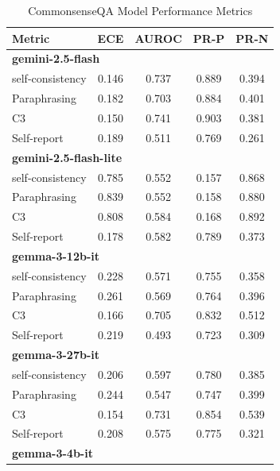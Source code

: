 \documentclass[11pt]{article}
\theoremstyle{plain}
\theoremstyle{definition}
\theoremstyle{remark}
\begin{document}
\begin{table}[p]
\centering
\caption{CommonsenseQA Model Performance Metrics}
\label{tab:cqa-metrics}
\scriptsize
\begin{minipage}[t]{0.48\textwidth}
    \centering
    \begin{tabular}{lcccc}
        \toprule
        \textbf{Metric} & \textbf{ECE} & \textbf{AUROC} & \textbf{PR-P} & \textbf{PR-N} \\
        \midrule
        \multicolumn{5}{l}{\textbf{gemini-2.5-flash}} \\
        self-consistency & 0.146 & 0.737 & 0.889 & 0.394 \\
        Paraphrasing     & 0.182 & 0.703 & 0.884 & 0.401 \\
       C3             & 0.150 & 0.741 & 0.903 & 0.381 \\
        Self-report      & 0.189 & 0.511 & 0.769 & 0.261 \\
        \midrule
        \multicolumn{5}{l}{\textbf{gemini-2.5-flash-lite}} \\
        self-consistency & 0.785 & 0.552 & 0.157 & 0.868 \\
        Paraphrasing     & 0.839 & 0.552 & 0.158 & 0.880 \\
       C3             & 0.808 & 0.584 & 0.168 & 0.892 \\
        Self-report      & 0.178 & 0.582 & 0.789 & 0.373 \\
        \midrule
        \multicolumn{5}{l}{\textbf{gemma-3-12b-it}} \\
        self-consistency & 0.228 & 0.571 & 0.755 & 0.358 \\
        Paraphrasing     & 0.261 & 0.569 & 0.764 & 0.396 \\
       C3             & 0.166 & 0.705 & 0.832 & 0.512 \\
        Self-report      & 0.219 & 0.493 & 0.723 & 0.309 \\
        \midrule
        \multicolumn{5}{l}{\textbf{gemma-3-27b-it}} \\
        self-consistency & 0.206 & 0.597 & 0.780 & 0.385 \\
        Paraphrasing     & 0.244 & 0.547 & 0.747 & 0.399 \\
       C3             & 0.154 & 0.731 & 0.854 & 0.539 \\
        Self-report      & 0.208 & 0.575 & 0.775 & 0.321 \\
        \midrule
        \multicolumn{5}{l}{\textbf{gemma-3-4b-it}} \\

\end{tabular}
\end{minipage}
\end{table}
\end{document}
